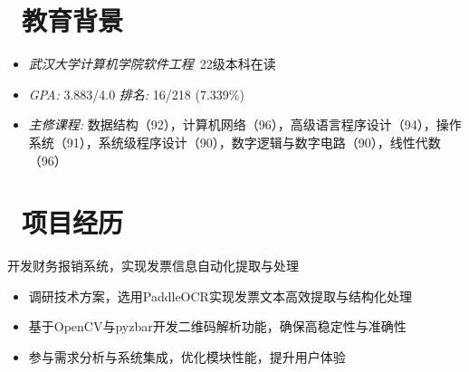 \documentclass{../../styles/resume}
\begin{document}

\begin{center}
  \begin{minipage}{\textwidth}
    \centering
    \vspace{0.1em}
  \end{minipage}
\end{center}


\section{\faGraduationCap\ 教育背景}
\begin{itemize}
  \item \textit{武汉大学计算机学院软件工程}\ 22级本科在读
  \item \textit{GPA:} 3.883/4.0 \quad\quad \textit{排名:} 16/218 (7.339\%)
  \item \textit{主修课程: } 数据结构（92），计算机网络（96），⾼级语⾔程序设计（94），操作系统（91），系统级程序设计（90），数字逻辑与数字电路（90），线性代数（96）
\end{itemize}




\section{\faUsers\ 项目经历}

\begin{onehalfspacing}
开发财务报销系统，实现发票信息自动化提取与处理
\begin{itemize}
  \item 调研技术方案，选用PaddleOCR实现发票文本高效提取与结构化处理
  \item 基于OpenCV与pyzbar开发二维码解析功能，确保高稳定性与准确性
  \item 参与需求分析与系统集成，优化模块性能，提升用户体验
\end{itemize}
\end{onehalfspacing}
\end{document}
